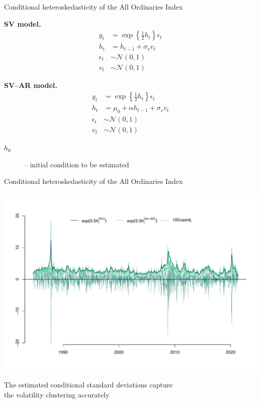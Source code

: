 \documentclass[notes,blackandwhite,mathsans,usenames,dvipsnames]{beamer}
\begin{document}
\begin{frame}{Conditional heteroskedasticity of the All Ordinaries Index}

\begin{multicols}{2}
\textbf{SV model.}
\begin{align*}
y_t &= \exp\left\{\frac{1}{2}h_t\right\} \epsilon_t\\[1ex]
h_t &= h_{t-1} + \sigma_v v_t\\[1ex]
\epsilon_t &\sim\mathcal{N}(0,1)\\[1ex]
v_t &\sim\mathcal{N}(0,1)
\end{align*}

\columnbreak

\textbf{SV--AR model.}
\begin{align*}
y_t &= \exp\left\{\frac{1}{2}h_t\right\} \epsilon_t\\[1ex]
h_t &= \mu_0 + \alpha h_{t-1} + \sigma_v v_t\\[1ex]
\epsilon_t &\sim\mathcal{N}(0,1)\\[1ex]
v_t &\sim\mathcal{N}(0,1)
\end{align*}

\end{multicols}


\bigskip\begin{description}
\item[$h_0$] {\color{mcxs2}-- initial condition to be estimated}
\end{description}
\end{frame}





\begin{frame}{Conditional heteroskedasticity of the All Ordinaries Index}
\begin{center}
\includegraphics[scale=0.48, trim=1.5cm 2cm 0cm 3.1cm]{sv.pdf}

\bigskip\small{\color{mcxs2}The estimated conditional standard deviations capture\\ the volatility clustering accurately}
\end{center}
\end{frame}
\end{document}
